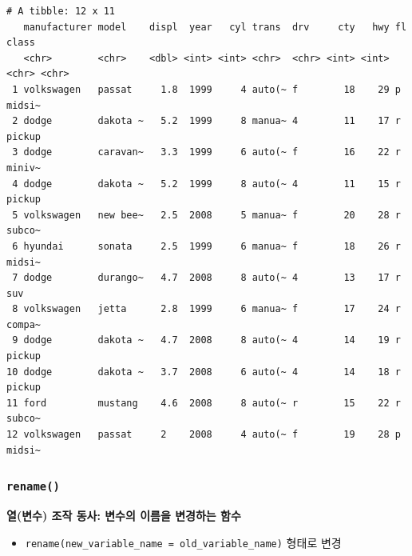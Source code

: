 \documentclass[
  11pt,
]{krantz}
\makeatletter
\newenvironment{Shaded}{\begin{snugshade}}{\end{snugshade}}
\newcommand{\CommentTok}[1]{\textcolor[rgb]{0.37,0.37,0.37}{\textit{#1}}}
\newcommand{\DataTypeTok}[1]{\textcolor[rgb]{0.27,0.27,0.27}{#1}}
\newcommand{\DecValTok}[1]{\textcolor[rgb]{0.06,0.06,0.06}{#1}}
\newcommand{\KeywordTok}[1]{\textcolor[rgb]{0.27,0.27,0.27}{\textbf{#1}}}
\newcommand{\NormalTok}[1]{#1}
\newcommand{\OperatorTok}[1]{\textcolor[rgb]{0.43,0.43,0.43}{\textbf{#1}}}
\newcommand{\StringTok}[1]{\textcolor[rgb]{0.5,0.5,0.5}{#1}}
\providecommand{\tightlist}{%
  \setlength{\itemsep}{0pt}\setlength{\parskip}{0pt}}
\newenvironment{kframe}{%
\medskip{}
\setlength{\fboxsep}{.8em}
 \def\at@end@of@kframe{}%
 \ifinner\ifhmode%
  \def\at@end@of@kframe{\end{minipage}}%
  \begin{minipage}{\columnwidth}%
 \fi\fi%
 \def\FrameCommand##1{\hskip\@totalleftmargin \hskip-\fboxsep
 \colorbox{shadecolor}{##1}\hskip-\fboxsep
     \hskip-\linewidth \hskip-\@totalleftmargin \hskip\columnwidth}%
 \MakeFramed {\advance\hsize-\width
   \@totalleftmargin\z@ \linewidth\hsize
   \@setminipage}}%
 {\par\unskip\endMakeFramed%
 \at@end@of@kframe}
\renewenvironment{quote}{\begin{kframe}}{\end{kframe}}
\makeatother
\begin{document}
\begin{verbatim}
# A tibble: 12 x 11
   manufacturer model    displ  year   cyl trans  drv     cty   hwy fl    class 
   <chr>        <chr>    <dbl> <int> <int> <chr>  <chr> <int> <int> <chr> <chr> 
 1 volkswagen   passat     1.8  1999     4 auto(~ f        18    29 p     midsi~
 2 dodge        dakota ~   5.2  1999     8 manua~ 4        11    17 r     pickup
 3 dodge        caravan~   3.3  1999     6 auto(~ f        16    22 r     miniv~
 4 dodge        dakota ~   5.2  1999     8 auto(~ 4        11    15 r     pickup
 5 volkswagen   new bee~   2.5  2008     5 manua~ f        20    28 r     subco~
 6 hyundai      sonata     2.5  1999     6 manua~ f        18    26 r     midsi~
 7 dodge        durango~   4.7  2008     8 auto(~ 4        13    17 r     suv   
 8 volkswagen   jetta      2.8  1999     6 manua~ f        17    24 r     compa~
 9 dodge        dakota ~   4.7  2008     8 auto(~ 4        14    19 r     pickup
10 dodge        dakota ~   3.7  2008     6 auto(~ 4        14    18 r     pickup
11 ford         mustang    4.6  2008     8 auto(~ r        15    22 r     subco~
12 volkswagen   passat     2    2008     4 auto(~ f        19    28 p     midsi~
\end{verbatim}

\normalsize

\hypertarget{dplyr-rename}{%
\subsubsection*{\texorpdfstring{\texttt{rename()}}{rename()}}\label{dplyr-rename}}


\begin{quote}
\textbf{열(변수) 조작 동사: 변수의 이름을 변경하는 함수}
\end{quote}

\begin{itemize}
\tightlist
\item
  \texttt{rename(new\_variable\_name\ =\ old\_variable\_name)} 형태로 변경
\end{itemize}

\footnotesize

\begin{Shaded}
\end{Shaded}
\end{document}
